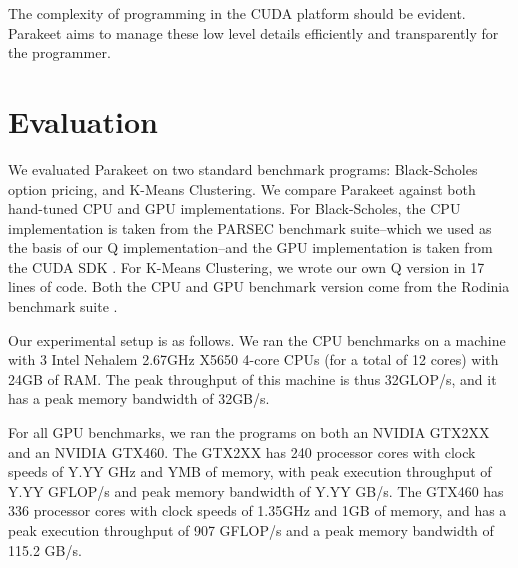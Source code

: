 \documentclass[preprint]{sigplanconf}
\begin{document}
The complexity of programming in the CUDA platform should be evident.  Parakeet
aims to manage these low level details efficiently and transparently for the
programmer.

%

\section{Evaluation}
\label{Evaluation}

We evaluated Parakeet on two standard benchmark programs: Black-Scholes option
pricing, and K-Means Clustering.  We compare Parakeet against both hand-tuned
CPU and GPU implementations.  For Black-Scholes, the CPU implementation is
taken from the PARSEC \cite{Bien08} benchmark suite--which we used as the basis
of our Q implementation--and the GPU implementation is taken from the CUDA SDK
\cite{NvidSD}.  For K-Means Clustering, we wrote our own Q version in 17 lines
of code.  Both the CPU and GPU benchmark version come from the Rodinia
benchmark suite \cite{Che09}.

Our experimental setup is as follows.  We ran the CPU benchmarks on a machine
with 3 Intel Nehalem 2.67GHz X5650 4-core CPUs (for a total of 12 cores) with
24GB of RAM.  The peak throughput of this machine is thus 32GLOP/s, and it has
a peak memory bandwidth of 32GB/s.

For all GPU benchmarks, we ran the programs on both an NVIDIA GTX2XX and an
NVIDIA GTX460.  The GTX2XX has 240 processor cores with clock speeds of
Y.YY GHz and YMB of memory, with peak execution throughput of Y.YY GFLOP/s and
peak memory bandwidth of Y.YY GB/s.  The GTX460 has 336 processor cores with
clock speeds of 1.35GHz and 1GB of memory, and has a peak execution throughput
of 907 GFLOP/s and a peak memory bandwidth of 115.2 GB/s.
\end{document}
